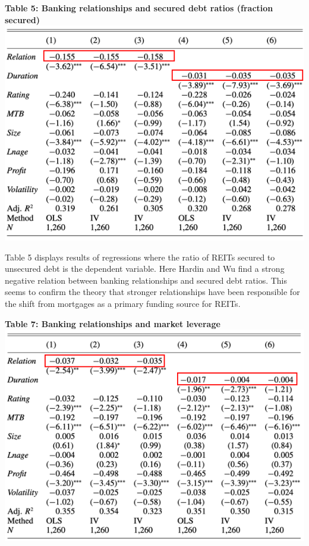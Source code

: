 \documentclass[a4paper, 12pt]{article} %
\begin{document}
\begin{center}
\textbf{Table 5: Banking relationships and secured debt ratios (fraction secured)}
\includegraphics[width=1\textwidth]{Table_V.png}

\end{center}

Table 5 displays results of regressions where the ratio of REITs secured to unsecured debt is the dependent variable. Here Hardin and Wu find a strong negative relation between banking relationships and secured debt ratios. This seems to confirm the theory that stronger relationships have been responsible for the shift from mortgages as a primary funding source for REITs.

\begin{center}
\textbf{Table 7: Banking relationships and market leverage}
\includegraphics[width=1\textwidth]{Table_VII.png}

\end{center}
\end{document}
